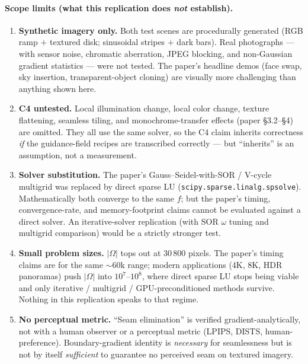 \documentclass[11pt]{article}
\begin{document}
\paragraph{Scope limits (what this replication does \emph{not} establish).}
\begin{enumerate}
  \item \textbf{Synthetic imagery only.} Both test scenes are procedurally
        generated (RGB ramp $+$ textured disk; sinusoidal stripes $+$ dark
        bars). Real photographs --- with sensor noise, chromatic aberration,
        JPEG blocking, and non-Gaussian gradient statistics --- were not
        tested. The paper's headline demos (face swap, sky insertion,
        transparent-object cloning) are visually more challenging than
        anything shown here.
  \item \textbf{C4 untested.} Local illumination change, local color change,
        texture flattening, seamless tiling, and monochrome-transfer effects
        (paper \S 3.2--\S 4) are omitted. They all use the same solver, so
        the C4 claim inherits correctness \emph{if} the guidance-field
        recipes are transcribed correctly --- but ``inherits'' is an
        assumption, not a measurement.
  \item \textbf{Solver substitution.} The paper's Gauss--Seidel-with-SOR /
        V-cycle multigrid was replaced by direct sparse LU
        (\texttt{scipy.sparse.linalg.spsolve}). Mathematically both converge
        to the same $f$; but the paper's timing, convergence-rate, and
        memory-footprint claims cannot be evaluated against a direct solver.
        An iterative-solver replication (with SOR $\omega$ tuning and
        multigrid comparison) would be a strictly stronger test.
  \item \textbf{Small problem sizes.} $|\Omega|$ tops out at 30\,800 pixels.
        The paper's timing claims are for the same $\sim 60$k range;
        modern applications (4K, 8K, HDR panoramas) push $|\Omega|$ into
        $10^7$--$10^8$, where direct sparse LU stops being viable and only
        iterative / multigrid / GPU-preconditioned methods survive.
        Nothing in this replication speaks to that regime.
  \item \textbf{No perceptual metric.} ``Seam elimination'' is verified
        gradient-analytically, not with a human observer or a perceptual
        metric (LPIPS, DISTS, human-preference). Boundary-gradient identity
        is \emph{necessary} for seamlessness but is not by itself
        \emph{sufficient} to guarantee no perceived seam on textured
        imagery.
\end{enumerate}
\end{document}
